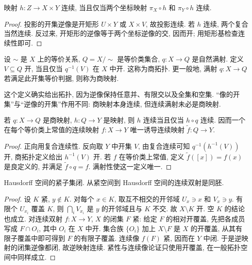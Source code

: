 \begin{proposition}
映射 $h:Z\to X\times Y$ 连续, 当且仅当两个坐标映射 $\pi_X\circ h$ 和 $\pi_Y\circ h$ 连续.
\end{proposition}
\begin{proof}
投影的开集逆像是开矩形 $U\times Y$ 或 $X\times V$, 故投影连续. 若 $h$ 连续, 两个复合当然连续. 反过来, 开矩形的逆像等于两个坐标逆像的交, 因而开; 用矩形基检查连续性即可.
\end{proof}

\begin{definition}
设 $\sim$ 是 $X$ 上的等价关系, $Q=X/{\sim}$ 是等价类集合, $q:X\to Q$ 是自然满射. 定义 $V\subseteq Q$ 开, 当且仅当 $q^{-1}(V)$ 在 $X$ 中开. 这称为商拓扑. 更一般地, 满射 $q:X\to Q$ 若满足此开集等价判据, 则称为商映射.
\end{definition}
这个定义确实给出拓扑, 因为逆像保持任意并、有限交以及全集和空集. “像的开集”与“逆像的开集”作用不同: 商映射本身连续, 但连续满射未必是商映射.

\begin{proposition}\label{thm:quotient-universal}
若 $q:X\to Q$ 是商映射, $h:Q\to Y$ 是映射, 则 $h$ 连续当且仅当 $h\circ q$ 连续. 因而一个在每个等价类上常值的连续映射 $f:X\to Y$ 唯一诱导连续映射 $\widetilde f:Q\to Y$.
\end{proposition}
\begin{proof}
正向用复合连续性. 反向取 $Y$ 中开集 $V$, 由复合连续可知 $q^{-1}(h^{-1}(V))$ 开, 商拓扑定义给出 $h^{-1}(V)$ 开. 若 $f$ 在等价类上常值, 定义 $\widetilde f([x])=f(x)$ 是良定义的, 并满足 $\widetilde f\circ q=f$. 满射性使这一定义唯一.
\end{proof}

\begin{lemma}\label{thm:compact-hausdorff}
Hausdorff 空间的紧子集闭. 从紧空间到 Hausdorff 空间的连续双射是同胚.
\end{lemma}
\begin{proof}
设 $K$ 紧, $y\notin K$. 对每个 $x\in K$, 取互不相交的开邻域 $U_x\ni x$ 和 $V_x\ni y$. 有限个 $U_{x_i}$ 覆盖 $K$, 则 $\bigcap_i V_{x_i}$ 是 $y$ 的开邻域且与 $K$ 不交. 故 $X\setminus K$ 开. 空 $K$ 的结论也成立. 对连续双射 $f:X\to Y$, $X$ 的闭集 $F$ 紧: 给定 $F$ 的相对开覆盖, 先把各成员写成 $F\cap O_i$, 其中 $O_i$ 在 $X$ 中开. 集合族 $\{O_i\}$ 加上 $X\setminus F$ 是 $X$ 的开覆盖, 从其有限子覆盖中即可得到 $F$ 的有限子覆盖. 连续像 $f(F)$ 紧, 因而在 $Y$ 中闭. 于是逆映射的闭集逆像都闭, 故逆映射连续. 紧性与连续像论证只使用开覆盖, 在一般拓扑空间中同样成立.
\end{proof}

